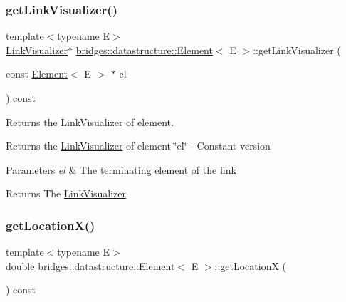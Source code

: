 \subsubsection{\texorpdfstring{get\+Link\+Visualizer()}{getLinkVisualizer()}\hspace{0.1cm}{\footnotesize\ttfamily [2/2]}}
{\footnotesize\ttfamily template$<$typename E$>$ \\
\hyperlink{classbridges_1_1datastructure_1_1_link_visualizer}{Link\+Visualizer}$\ast$ \hyperlink{classbridges_1_1datastructure_1_1_element}{bridges\+::datastructure\+::\+Element}$<$ E $>$\+::get\+Link\+Visualizer (\begin{DoxyParamCaption}\item[{const \hyperlink{classbridges_1_1datastructure_1_1_element}{Element}$<$ E $>$ $\ast$}]{el }\end{DoxyParamCaption}) const\hspace{0.3cm}{\ttfamily [inline]}}



Returns the \hyperlink{classbridges_1_1datastructure_1_1_link_visualizer}{Link\+Visualizer} of element. 

Returns the \hyperlink{classbridges_1_1datastructure_1_1_link_visualizer}{Link\+Visualizer} of element \char`\"{}el\char`\"{} -\/ Constant version


\begin{DoxyParams}{Parameters}
{\em el} & The terminating element of the link \\
\hline
\end{DoxyParams}
\begin{DoxyReturn}{Returns}
The \hyperlink{classbridges_1_1datastructure_1_1_link_visualizer}{Link\+Visualizer} 
\end{DoxyReturn}
\mbox{\label{classbridges_1_1datastructure_1_1_element_a471f2f69147deb0f514bb9720e0e18ea}} 
\subsubsection{\texorpdfstring{get\+Location\+X()}{getLocationX()}}
{\footnotesize\ttfamily template$<$typename E$>$ \\
double \hyperlink{classbridges_1_1datastructure_1_1_element}{bridges\+::datastructure\+::\+Element}$<$ E $>$\+::get\+LocationX (\begin{DoxyParamCaption}{ }\end{DoxyParamCaption}) const\hspace{0.3cm}{\ttfamily [inline]}}



